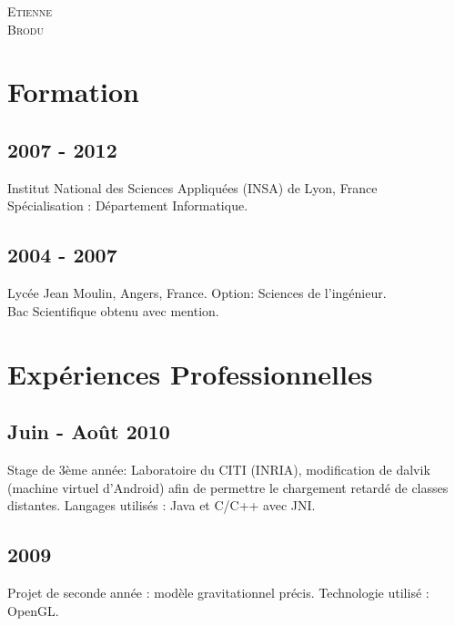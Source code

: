 
\usepackage[french]{babel}



\pagestyle{empty}

	{
		\LARGE{\textsc{Etienne}\\
				\textsc{Brodu}}
	}
	
	
	
\section{Formation}
	\subsection{2007 - 2012}
		{Institut National des Sciences Appliquées (INSA) de Lyon, France\\
		 Spécialisation : Département Informatique.}
		
	\subsection{2004 - 2007}
		{Lycée Jean Moulin, Angers, France. Option: Sciences de l'ingénieur.\\
		 Bac Scientifique obtenu avec mention.}

\section{Expériences Professionnelles}
	\subsection{Juin - Août 2010}
		{Stage de 3ème année: Laboratoire du CITI (INRIA), modification de dalvik (machine virtuel d'Android) afin de permettre le chargement retardé de classes distantes. Langages utilisés : Java et C/C++ avec JNI.}

	\subsection{2009}
		{Projet de seconde année : modèle gravitationnel précis. Technologie utilisé : OpenGL.}
		
